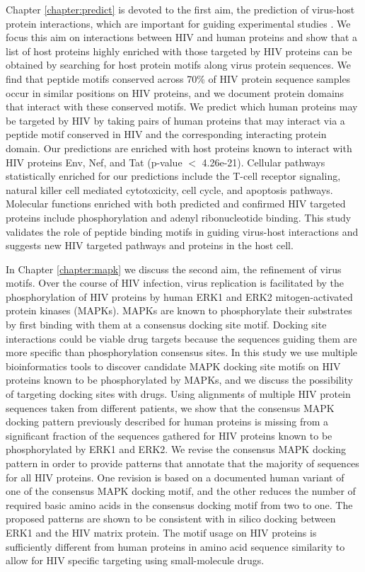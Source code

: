 Chapter \ref{chapter:predict} is devoted to the first aim, the
prediction of virus-host protein interactions, which are important for
guiding experimental studies
\cite{jansen2003bayesian,lee2004probabilistic}. We focus this aim on
interactions between HIV and human proteins and show that a list of
host proteins highly enriched with those targeted by HIV proteins can
be obtained by searching for host protein motifs along virus protein
sequences. We find that peptide motifs conserved across 70\% of HIV
protein sequence samples occur in similar positions on HIV proteins,
and we document protein domains that interact with these conserved
motifs. We predict which human proteins may be targeted by HIV by
taking pairs of human proteins that may interact via a peptide motif
conserved in HIV and the corresponding interacting protein domain. Our
predictions are enriched with host proteins known to interact with HIV
proteins Env, Nef, and Tat (p-value $<$ 4.26e-21). Cellular pathways
statistically enriched for our predictions include the T-cell receptor
signaling, natural killer cell mediated cytotoxicity, cell cycle, and
apoptosis pathways. Molecular functions enriched with both predicted
and confirmed HIV targeted proteins include phosphorylation and adenyl
ribonucleotide binding. This study validates the role of peptide
binding motifs in guiding virus-host interactions and suggests new HIV
targeted pathways and proteins in the host cell.

In Chapter \ref{chapter:mapk} we discuss the second aim, the
refinement of virus motifs. Over the course of HIV infection, virus
replication is facilitated by the phosphorylation of HIV proteins by
human ERK1 and ERK2 mitogen-activated protein kinases (MAPKs). MAPKs
are known to phosphorylate their substrates by first binding with them
at a consensus docking site motif. Docking site interactions could be
viable drug targets because the sequences guiding them are more
specific than phosphorylation consensus sites. In this study we use
multiple bioinformatics tools to discover candidate MAPK docking site
motifs on HIV proteins known to be phosphorylated by MAPKs, and we
discuss the possibility of targeting docking sites with drugs. Using
alignments of multiple HIV protein sequences taken from different
patients, we show that the consensus MAPK docking pattern previously
described for human proteins is missing from a significant fraction of
the sequences gathered for HIV proteins known to be phosphorylated by
ERK1 and ERK2. We revise the consensus MAPK docking pattern in order
to provide patterns that annotate that the majority of sequences for
all HIV proteins. One revision is based on a documented human variant
of one of the consensus MAPK docking motif, and the other reduces the
number of required basic amino acids in the consensus docking motif
from two to one. The proposed patterns are shown to be consistent with
in silico docking between ERK1 and the HIV matrix protein. The motif
usage on HIV proteins is sufficiently different from human proteins in
amino acid sequence similarity to allow for HIV specific targeting
using small-molecule drugs. 

